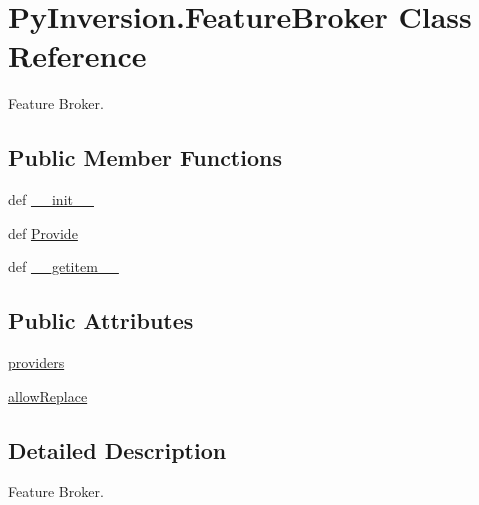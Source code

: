 \hypertarget{class_py_inversion_1_1_feature_broker}{\section{Py\+Inversion.\+Feature\+Broker Class Reference}
\label{class_py_inversion_1_1_feature_broker}
}


Feature Broker.  


\subsection*{Public Member Functions}
\begin{DoxyCompactItemize}
\item 
def \hyperlink{class_py_inversion_1_1_feature_broker_a175067675b251079ca1d80e4aed4864d}{\+\_\+\+\_\+init\+\_\+\+\_\+}
\item 
def \hyperlink{class_py_inversion_1_1_feature_broker_ab9530aada9d12386127d047cd1307aa0}{Provide}
\item 
def \hyperlink{class_py_inversion_1_1_feature_broker_a064332733ed0f5f7826a924f7ebb0684}{\+\_\+\+\_\+getitem\+\_\+\+\_\+}
\end{DoxyCompactItemize}
\subsection*{Public Attributes}
\begin{DoxyCompactItemize}
\item 
\hyperlink{class_py_inversion_1_1_feature_broker_ab400ab32713a1a15bbf13f1cd901d9eb}{providers}
\item 
\hyperlink{class_py_inversion_1_1_feature_broker_a563bc54029c34054f768844c440aa5eb}{allow\+Replace}
\end{DoxyCompactItemize}


\subsection{Detailed Description}
Feature Broker. 



